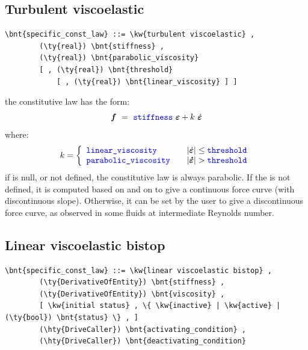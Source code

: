\subsection{Turbulent viscoelastic}
\begin{Verbatim}[commandchars=\\\{\}]
    \bnt{specific_const_law} ::= \kw{turbulent viscoelastic} ,
        (\ty{real}) \bnt{stiffness} ,
        (\ty{real}) \bnt{parabolic_viscosity}
        [ , (\ty{real}) \bnt{threshold}
            [ , (\ty{real}) \bnt{linear_viscosity} ] ]
\end{Verbatim}
the constitutive law has the form:
\begin{displaymath}
    \T{f} \ = \ \nt{stiffness} \ \T{\varepsilon} + k \ \dot{\T{\varepsilon}}
\end{displaymath}
where:
\begin{displaymath}
    k = \lcubr{\matr{lcr}{
        \nt{linear\_viscosity} & & 
            \shbr{\dot{\T{\varepsilon}}} \leq \nt{threshold} \\
        \nt{parabolic\_viscosity} & &
            \shbr{\T{\dot{\varepsilon}}} > \nt{threshold}
    }}
\end{displaymath}
if  is null, or not defined, the constitutive law is always
parabolic. If the  is not defined, it is
computed based on  and on 
 to give a continuous force curve (with discontinuous slope).
Otherwise, it can be set by the user to give a discontinuous force curve,
as observed in some fluids at intermediate Reynolds number.

\subsection{Linear viscoelastic bistop}
\begin{Verbatim}[commandchars=\\\{\}]
    \bnt{specific_const_law} ::= \kw{linear viscoelastic bistop} ,
        (\ty{DerivativeOfEntity}) \bnt{stiffness} ,
        (\ty{DerivativeOfEntity}) \bnt{viscosity} ,
        [ \kw{initial status} , \{ \kw{inactive} | \kw{active} | (\ty{bool}) \bnt{status} \} , ]
        (\hty{DriveCaller}) \bnt{activating_condition} ,
        (\hty{DriveCaller}) \bnt{deactivating_condition}
\end{Verbatim}
  
